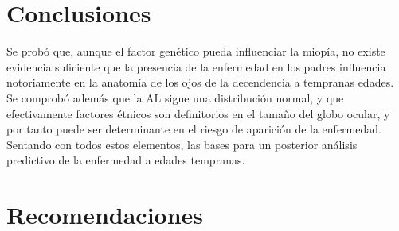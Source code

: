 \documentclass[a4paper,10pt,twocolumn]{article}
\begin{document}




\section{Conclusiones}\label{sec:conc}

  Se probó que, aunque el factor genético pueda influenciar la miopía, no existe evidencia suficiente que la presencia de la enfermedad en los padres influencia notoriamente en la anatomía de los ojos de la decendencia a tempranas edades. Se comprobó además que la AL sigue una distribución normal, y que efectivamente factores étnicos son definitorios en el tamaño del globo ocular, y por tanto puede ser determinante en el riesgo de aparición de la enfermedad. Sentando con todos estos elementos, las bases para un posterior análisis predictivo de la enfermedad a edades tempranas.




\section{Recomendaciones}\label{sec:rec}
\end{document}

